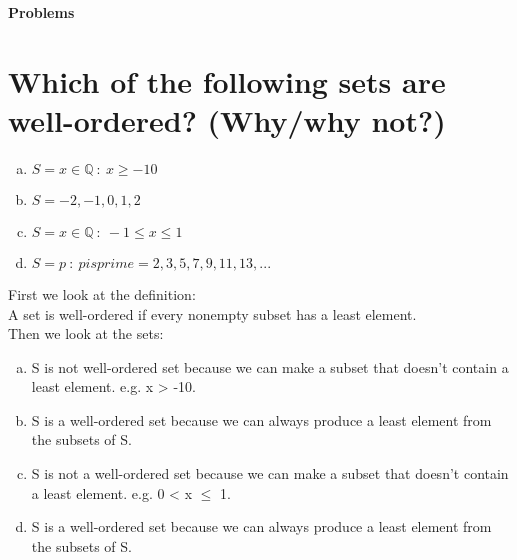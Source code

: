 \textbf{\Huge Problems}
\section{Which of the following sets are well-ordered? (Why/why not?)}
\begin{enumerate}[a.]
\item $S={x\in\mathbb{Q}\ :\ x\geq-10}$
\item $S={-2,-1,0,1,2}$
\item $S={x\in\mathbb{Q}\ :\ -1\leq x\leq 1}$
\item $S={p\ : \ p is prime} = {2,3,5,7,9,11,13,...}$
\end{enumerate}
First we look at the definition:\\
A set is well-ordered if every nonempty subset has a least element.\\
Then we look at the sets:\\
\begin{enumerate}[a.]
\item S is not well-ordered set because we can make a subset that doesn't contain a least element. e.g. x > -10. 
\item S is a well-ordered set because we can always produce a least element from the subsets of S.
\item S is not a well-ordered set because we can make a subset that doesn't contain a least element. e.g. 0 < x $\leq$ 1.
\item S is a well-ordered set because we can always produce a least element from the subsets of S.
\end{enumerate}

